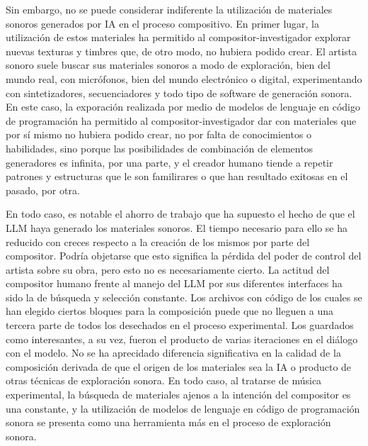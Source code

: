 Sin embargo, no se puede considerar indiferente la utilización de materiales sonoros generados por IA en el proceso compositivo. En primer lugar, la utilización de estos materiales ha permitido al compositor-investigador explorar nuevas texturas y timbres que, de otro modo, no hubiera podido crear. El artista sonoro suele buscar sus materiales sonoros a modo de exploración, bien del mundo real, con micrófonos, bien del mundo electrónico o digital, experimentando con sintetizadores, secuenciadores y todo tipo de software de generación sonora. En este caso, la exporación realizada por medio de modelos de lenguaje en código de programación ha permitido al compositor-investigador dar con materiales que por sí mismo no hubiera podido crear, no por falta de conocimientos o habilidades, sino porque las posibilidades de combinación de elementos generadores es infinita, por una parte, y el creador humano tiende a repetir patrones y estructuras que le son familirares o que han resultado exitosas en el pasado, por otra.

En todo caso, es notable el ahorro de trabajo que ha supuesto el hecho de que el LLM haya generado los materiales sonoros. El tiempo necesario para ello se ha reducido con creces respecto a la creación de los mismos por parte del compositor. Podría objetarse que esto significa la pérdida del poder de control del artista sobre su obra, pero esto no es necesariamente cierto. La actitud del compositor humano frente al manejo del LLM por sus diferentes interfaces ha sido la de búsqueda y selección constante. Los archivos con código de los cuales se han elegido ciertos bloques para la composición puede que no lleguen a una tercera parte de todos los desechados en el proceso experimental. Los guardados como interesantes, a su vez, fueron el producto de varias iteraciones en el diálogo con el modelo. No se ha aprecidado diferencia significativa en la calidad de la composición derivada de que el origen de los materiales sea la IA o producto de otras técnicas de exploración sonora. En todo caso, al tratarse de música experimental, la búsqueda de materiales ajenos a la intención del compositor es una constante, y la utilización de modelos de lenguaje en código de programación sonora se presenta como una herramienta más en el proceso de exploración sonora.

